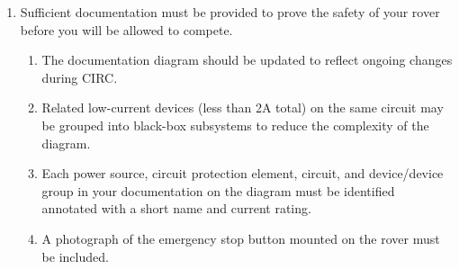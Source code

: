 \begin{enumerate}
    \item Sufficient documentation must be provided to prove the safety of your rover before you will be allowed to compete.
    \begin{enumerate}
        \item The documentation diagram should be updated to reflect ongoing changes during CIRC. \label{req7.5}
        \item Related low-current devices (less than 2A total) on the same circuit may be grouped into black-box subsystems to reduce the complexity of the diagram.
        \item Each power source, circuit protection element, circuit, and device/device group in your documentation on the diagram must be identified annotated with a short name and current rating.
        \item A photograph of the emergency stop button mounted on the rover must be included.
    \end{enumerate}


    \end{enumerate}

 
